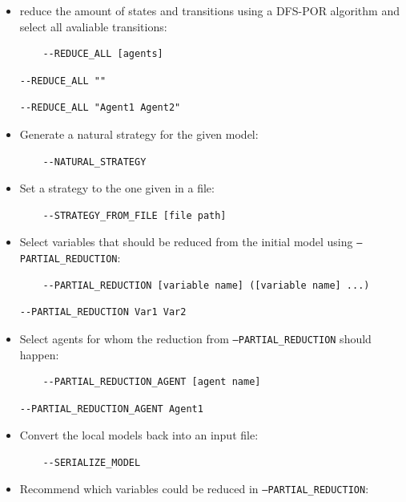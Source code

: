 \documentclass[12pt]{article}
\begin{document}
\begin{itemize}
\begin{lstlisting}[title={Example reduction with 2 specified agents.}]
  \end{lstlisting}
  \item reduce the amount of states and transitions using a DFS-POR algorithm and select all avaliable transitions:
  \begin{lstlisting}
    --REDUCE_ALL [agents]
  \end{lstlisting}
  \begin{lstlisting}[title={Example reduction with no specified agent.}]
    --REDUCE_ALL ""
  \end{lstlisting}
  \begin{lstlisting}[title={Example reduction with 2 specified agents.}]
    --REDUCE_ALL "Agent1 Agent2"
  \end{lstlisting}
  \item Generate a natural strategy for the given model:
  \begin{lstlisting}
    --NATURAL_STRATEGY
  \end{lstlisting}
  \item Set a strategy to the one given in a file:
  \begin{lstlisting}
    --STRATEGY_FROM_FILE [file path]
  \end{lstlisting}
  \item Select variables that should be reduced from the initial model using \texttt{--PARTIAL\_REDUCTION}:
  \begin{lstlisting}
    --PARTIAL_REDUCTION [variable name] ([variable name] ...)
  \end{lstlisting}
  \begin{lstlisting}[title={Example reduction with 2 variables.}]
    --PARTIAL_REDUCTION Var1 Var2
  \end{lstlisting}
  \item Select agents for whom the reduction from \texttt{--PARTIAL\_REDUCTION} should happen:
  \begin{lstlisting}
    --PARTIAL_REDUCTION_AGENT [agent name]
  \end{lstlisting}
  \begin{lstlisting}[title={Example reduction with 2 agents.}]
    --PARTIAL_REDUCTION_AGENT Agent1
  \end{lstlisting}
  \item Convert the local models back into an input file:
  \begin{lstlisting}
    --SERIALIZE_MODEL
  \end{lstlisting}
  \item Recommend which variables could be reduced in \texttt{--PARTIAL\_REDUCTION}:

\end{itemize}
\end{document}
